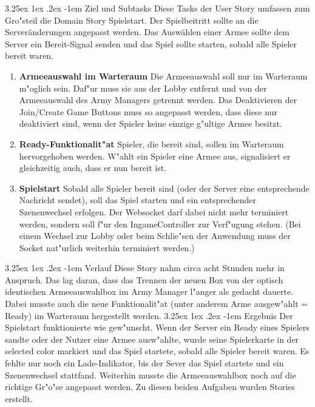 \documentclass[12pt, titlepage]{scrartcl}
\makeatletter
\renewcommand\paragraph{\@startsection{paragraph}{5}{\z@}%
  {3.25ex \@plus1ex \@minus.2ex}%
  {-1em}%
  {\normalfont\normalsize\bfseries}}
\makeatother
\begin{document}
	            \paragraph{Ziel und Subtasks}
		         		Diese Tasks der User Story umfassen zum Gro"steil die Domain Story Spielstart. Der Spielbeitritt sollte an die Server\"anderungen angepasst werden. Das Ausw\"ahlen einer Armee sollte dem Server ein Bereit-Signal senden und das Spiel sollte starten, sobald alle Spieler bereit waren.
	                	\begin{enumerate}[label={}]
		                	\item \textbf{Armeeauswahl im Warteraum} \hspace{5pt} Die Armeeauswahl soll nur im Warteraum m"oglich sein. Daf"ur muss sie aus der Lobby entfernt und von der Armeeauswahl des Army Managers getrennt werden. Das Deaktivieren der Join/Create Game Buttons muss so angepasst werden, dass diese nur deaktiviert sind, wenn der Spieler keine einzige g"ultige Armee besitzt.
		                	\item \textbf{Ready-Funktionalit"at} \hspace{5pt} Spieler, die bereit sind, sollen im Warteraum hervorgehoben werden. W"ahlt ein Spieler eine Armee aus, signalisiert er gleichzeitig auch, dass er nun bereit ist.
		                	\item \textbf{Spielstart} \hspace{5pt} Sobald alle Spieler bereit sind (oder der Server eine entsprechende Nachricht sendet), soll das Spiel starten und ein entsprechender Szenenwechsel erfolgen. Der Websocket darf dabei nicht mehr terminiert werden, sondern soll f"ur den IngameController zur Verf"ugung stehen. (Bei einem Wechsel zur Lobby oder beim Schlie"sen der Anwendung muss der Socket nat"urlich weiterhin terminiert werden.)
	                \end{enumerate}
                \paragraph{Verlauf}
                	Diese Story nahm circa acht Stunden mehr in Anspruch. Das lag daran, dass das Trennen der neuen Box von der optisch identischen Armeeauswahlbox im Army Manager l"anger als gedacht dauerte. Dabei musste auch die neue Funktionalit"at (unter anderem Arme ausgew"ahlt = Ready) im Warteraum hergestellt werden.
                \paragraph{Ergebnis}
                	Der Spielstart funktionierte wie gew"unscht. Wenn der Server ein Ready eines Spielers sandte oder der Nutzer eine Armee ausw"ahlte, wurde seine Spielerkarte in der selected color markiert und das Spiel startete, sobald alle Spieler bereit waren. Es fehlte nur noch ein Lade-Indikator, bis der Sever das Spiel startete und ein Szenenwechsel stattfand. Weiterhin musste die Armeeauswahlbox noch auf die richtige Gr"o"se angepasst werden. Zu diesen beiden Aufgaben wurden Stories erstellt.
\end{document}
